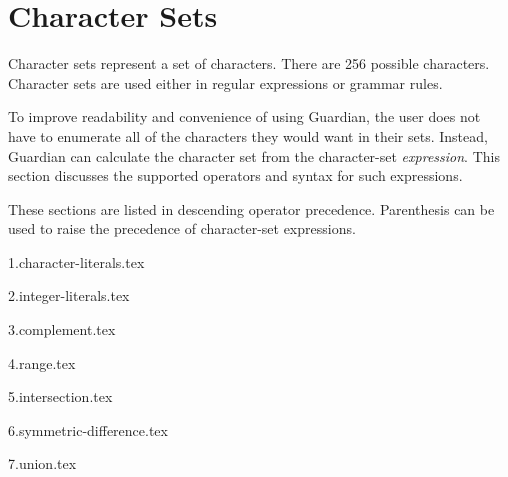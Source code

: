 
\section{Character Sets}
\label{sec:charset}
{
	Character sets represent a set of characters. There are
	256 possible characters.
	Character sets are used either in regular
	expressions or grammar rules.
	
	To improve readability and convenience of using Guardian, the user does not
	have to enumerate all of the characters they would want in their sets.
	Instead, Guardian can calculate the character set from the character-set
	\textit{expression}. This section discusses the supported operators and
	syntax for such expressions.
	
	These sections are listed in descending operator precedence. Parenthesis
	can be used to raise the precedence of character-set expressions.
	
	{1.character-literals.tex}
	
	{2.integer-literals.tex}
	
	{3.complement.tex}
	
	{4.range.tex}
	
	{5.intersection.tex}
	
	{6.symmetric-difference.tex}
	
	{7.union.tex}
}

